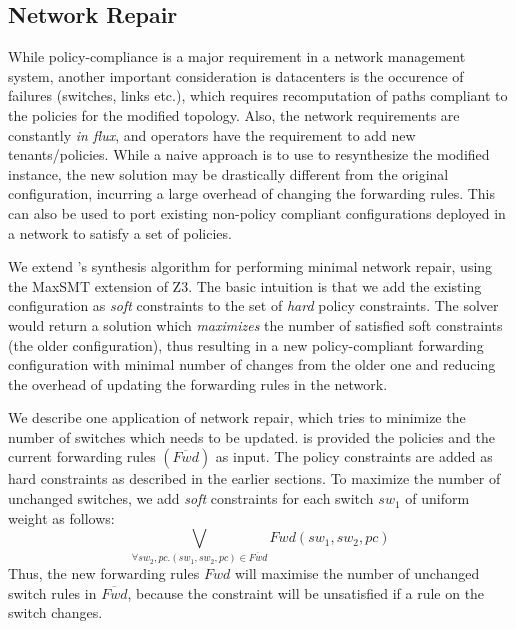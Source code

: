 \subsection{Network Repair}
While policy-compliance is a major requirement in a network management system,
another important consideration is datacenters is the occurence of failures (switches, links etc.),
which requires recomputation of paths compliant to the policies for the modified topology. 
Also, the network requirements are constantly \emph{in flux}, and operators have the requirement to 
add new tenants/policies. While a naive approach is to use \name to resynthesize the modified instance,
the new solution may be drastically different from the original configuration, incurring a
large overhead of changing the forwarding rules. This can also be used to
port existing non-policy compliant configurations deployed in a network to
satisfy a set of policies.

We extend \name's synthesis algorithm for performing
minimal network repair, using the MaxSMT extension of Z3. The basic intuition is that
we add the existing configuration as \emph{soft} constraints to the set of \emph{hard} 
policy constraints. The solver would return a solution which \emph{maximizes} the 
number of satisfied soft constraints (the older configuration),
thus resulting in a new policy-compliant forwarding 
configuration with minimal 
number of changes from the older one and reducing the overhead of
updating the forwarding rules in the network.  

We describe one application of network repair, which tries to minimize
the number of switches which needs to be updated. \name is provided the policies
and the current forwarding rules $(\overline{Fwd})$ as input. The policy constraints are added as hard
constraints as described in the earlier sections. To maximize the number of unchanged
switches, we add \emph{soft} constraints for each switch $sw_1$ of uniform weight as follows:
\begin{equation}
\bigvee_{\forall sw_2, pc. (sw_1, sw_2, pc) \in \overline{Fwd} } Fwd(sw_1, sw_2, pc)
\end{equation}
Thus, the new forwarding rules $Fwd$ will maximise the number of unchanged
switch rules in $\overline{Fwd}$, because the constraint will be unsatisfied if a rule on the
switch changes. 


 







 
